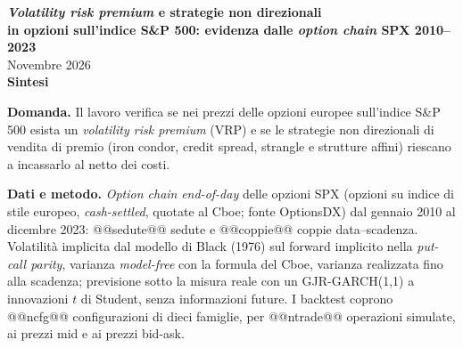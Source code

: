 \documentclass[11pt,a4paper]{article}
\begin{document}
\begin{center}
{\Large\bfseries \emph{Volatility risk premium} e strategie non direzionali\\[2pt] in opzioni sull'indice S\&P 500: evidenza dalle \emph{option chain} SPX 2010--2023}\\[6pt]
{\small Novembre 2026}\\[4pt]
{\bfseries Sintesi}
\end{center}
{\let\thefootnote\relax{}}

\textbf{Domanda.} Il lavoro verifica se nei prezzi delle opzioni europee sull'indice S\&P 500 esista un \emph{volatility risk premium} (VRP) e se le strategie non direzionali di vendita di premio (iron condor, credit spread, strangle e strutture affini) riescano a incassarlo al netto dei costi.

\textbf{Dati e metodo.} \emph{Option chain} \emph{end-of-day} delle opzioni SPX (opzioni su indice di stile europeo, \emph{cash-settled}, quotate al Cboe; fonte OptionsDX) dal gennaio 2010 al dicembre 2023: @@sedute@@ sedute e @@coppie@@ coppie data--scadenza. Volatilità implicita dal modello di Black (1976) sul forward implicito nella \emph{put-call parity}, varianza \emph{model-free} con la formula del Cboe, varianza realizzata fino alla scadenza; previsione sotto la misura reale con un GJR-GARCH(1,1) a innovazioni $t$ di Student, senza informazioni future. I backtest coprono @@ncfg@@ configurazioni di dieci famiglie, per @@ntrade@@ operazioni simulate, ai prezzi mid e ai prezzi bid-ask.
\end{document}
